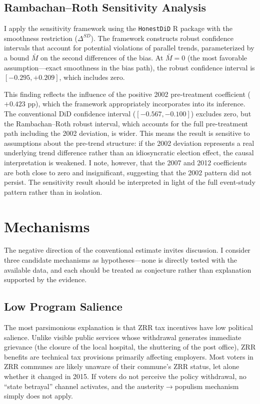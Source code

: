 \documentclass[12pt]{article}
\begin{document}
\subsection{Rambachan--Roth Sensitivity Analysis}

I apply the \citet{rambachan2023more} sensitivity framework using the \texttt{HonestDiD} R package with the smoothness restriction ($\Delta^{SD}$). The framework constructs robust confidence intervals that account for potential violations of parallel trends, parameterized by a bound $\bar{M}$ on the second differences of the bias. At $\bar{M} = 0$ (the most favorable assumption---exact smoothness in the bias path), the robust confidence interval is $[-0.295, +0.209]$, which includes zero.

This finding reflects the influence of the positive 2002 pre-treatment coefficient ($+0.423$ pp), which the framework appropriately incorporates into its inference. The conventional DiD confidence interval ($[-0.567, -0.100]$) excludes zero, but the Rambachan--Roth robust interval, which accounts for the full pre-treatment path including the 2002 deviation, is wider. This means the result is sensitive to assumptions about the pre-trend structure: if the 2002 deviation represents a real underlying trend difference rather than an idiosyncratic election effect, the causal interpretation is weakened. I note, however, that the 2007 and 2012 coefficients are both close to zero and insignificant, suggesting that the 2002 pattern did not persist. The sensitivity result should be interpreted in light of the full event-study pattern rather than in isolation.

\section{Mechanisms} \label{sec:mechanisms}

The negative direction of the conventional estimate invites discussion. I consider three candidate mechanisms as hypotheses---none is directly tested with the available data, and each should be treated as conjecture rather than explanation supported by the evidence.

\subsection{Low Program Salience}

The most parsimonious explanation is that ZRR tax incentives have low political salience. Unlike visible public services whose withdrawal generates immediate grievance (the closure of the local hospital, the shuttering of the post office), ZRR benefits are technical tax provisions primarily affecting employers. Most voters in ZRR communes are likely unaware of their commune's ZRR status, let alone whether it changed in 2015. If voters do not perceive the policy withdrawal, no ``state betrayal'' channel activates, and the austerity$\to$populism mechanism simply does not apply.
\end{document}
